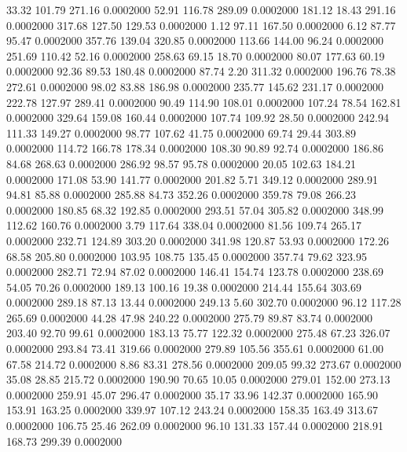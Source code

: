   33.32  101.79  271.16   0.0002000
  52.91  116.78  289.09   0.0002000
 181.12   18.43  291.16   0.0002000
 317.68  127.50  129.53   0.0002000
   1.12   97.11  167.50   0.0002000
   6.12   87.77   95.47   0.0002000
 357.76  139.04  320.85   0.0002000
 113.66  144.00   96.24   0.0002000
 251.69  110.42   52.16   0.0002000
 258.63   69.15   18.70   0.0002000
  80.07  177.63   60.19   0.0002000
  92.36   89.53  180.48   0.0002000
  87.74    2.20  311.32   0.0002000
 196.76   78.38  272.61   0.0002000
  98.02   83.88  186.98   0.0002000
 235.77  145.62  231.17   0.0002000
 222.78  127.97  289.41   0.0002000
  90.49  114.90  108.01   0.0002000
 107.24   78.54  162.81   0.0002000
 329.64  159.08  160.44   0.0002000
 107.74  109.92   28.50   0.0002000
 242.94  111.33  149.27   0.0002000
  98.77  107.62   41.75   0.0002000
  69.74   29.44  303.89   0.0002000
 114.72  166.78  178.34   0.0002000
 108.30   90.89   92.74   0.0002000
 186.86   84.68  268.63   0.0002000
 286.92   98.57   95.78   0.0002000
  20.05  102.63  184.21   0.0002000
 171.08   53.90  141.77   0.0002000
 201.82    5.71  349.12   0.0002000
 289.91   94.81   85.88   0.0002000
 285.88   84.73  352.26   0.0002000
 359.78   79.08  266.23   0.0002000
 180.85   68.32  192.85   0.0002000
 293.51   57.04  305.82   0.0002000
 348.99  112.62  160.76   0.0002000
   3.79  117.64  338.04   0.0002000
  81.56  109.74  265.17   0.0002000
 232.71  124.89  303.20   0.0002000
 341.98  120.87   53.93   0.0002000
 172.26   68.58  205.80   0.0002000
 103.95  108.75  135.45   0.0002000
 357.74   79.62  323.95   0.0002000
 282.71   72.94   87.02   0.0002000
 146.41  154.74  123.78   0.0002000
 238.69   54.05   70.26   0.0002000
 189.13  100.16   19.38   0.0002000
 214.44  155.64  303.69   0.0002000
 289.18   87.13   13.44   0.0002000
 249.13    5.60  302.70   0.0002000
  96.12  117.28  265.69   0.0002000
  44.28   47.98  240.22   0.0002000
 275.79   89.87   83.74   0.0002000
 203.40   92.70   99.61   0.0002000
 183.13   75.77  122.32   0.0002000
 275.48   67.23  326.07   0.0002000
 293.84   73.41  319.66   0.0002000
 279.89  105.56  355.61   0.0002000
  61.00   67.58  214.72   0.0002000
   8.86   83.31  278.56   0.0002000
 209.05   99.32  273.67   0.0002000
  35.08   28.85  215.72   0.0002000
 190.90   70.65   10.05   0.0002000
 279.01  152.00  273.13   0.0002000
 259.91   45.07  296.47   0.0002000
  35.17   33.96  142.37   0.0002000
 165.90  153.91  163.25   0.0002000
 339.97  107.12  243.24   0.0002000
 158.35  163.49  313.67   0.0002000
 106.75   25.46  262.09   0.0002000
  96.10  131.33  157.44   0.0002000
 218.91  168.73  299.39   0.0002000
